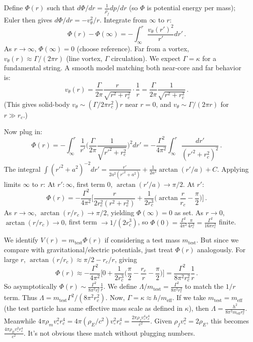 \documentclass[reprint,aps,onecolumn,nofootinbib]{revtex4-2}
\begin{document}
    Define $\Phi(r)$ such that $d\Phi/dr = \frac{1}{\rho_f}dp/dr$ (so $\Phi$ is potential energy per mass); Euler then gives $d\Phi/dr = -v_{\theta}^2/r$. Integrate from $\infty$ to $r$:
    \[
        \Phi(r) - \Phi(\infty) = -\int_{\infty}^{r} \frac{v_{\theta}(r')^2}{r'} dr'\,.
    \]
    As $r\to\infty$, $\Phi(\infty)=0$ (choose reference). Far from a vortex, $v_{\theta}(r) \approx \Gamma/(2\pi r)$ (line vortex, $\Gamma$ circulation). We expect $\Gamma = \kappa$ for a fundamental string. A smooth model matching both near-core and far behavior is:
    \[
        v_{\theta}(r) = \frac{\Gamma}{2\pi}\frac{r}{\sqrt{r^2+r_c^2}}\cdot\frac{1}{r} = \frac{\Gamma}{2\pi}\frac{1}{\sqrt{r^2+r_c^2}}\,.
    \]
    (This gives solid-body $v_{\theta}\sim (\Gamma/2\pi r_c^2)r$ near $r=0$, and $v_{\theta}\sim \Gamma/(2\pi r)$ for $r\gg r_c$.)

    Now plug in:
    \[
        \Phi(r) = -\int_{\infty}^{r} \frac{1}{r'}\Big(\frac{\Gamma}{2\pi}\frac{1}{\sqrt{r'^2+r_c^2}}\Big)^2 dr' = -\frac{\Gamma^2}{4\pi^2}\int_{\infty}^{r} \frac{dr'}{(r'^2+r_c^2)^2}\,.
    \]
    The integral $\int (r'^2+a^2)^{-2}dr' = \frac{r'}{2a^2(r'^2+a^2)} + \frac{1}{2a^3}\arctan(r'/a) + C$. Applying limits $\infty$ to $r$:
    At $r':\infty$, first term $0$, $\arctan(r'/a)\to\pi/2$. At $r'$:
    \[
        \Phi(r) = -\frac{\Gamma^2}{4\pi^2}\Big[\frac{r}{2r_c^2(r^2+r_c^2)} + \frac{1}{2r_c^3}\Big(\arctan\frac{r}{r_c} - \frac{\pi}{2}\Big)\Big]\,.
    \]
    As $r\to\infty$, $\arctan(r/r_c)\to\pi/2$, yielding $\Phi(\infty)=0$ as set. As $r\to0$, $\arctan(r/r_c)\to0$, first term $\to 1/(2r_c^3)$, so $\Phi(0) = \frac{\Gamma^2}{4\pi^2}\frac{\pi}{4r_c^3} = \frac{\Gamma^2}{16\pi r_c^3}$ finite.

    We identify $V(r) = m_{\text{test}}\Phi(r)$ if considering a test mass $m_{\text{test}}$. But since we compare with gravitational/electric potentials, just treat $\Phi(r)$ analogously. For large $r$, $\arctan(r/r_c)\approx \pi/2 - r_c/r$, giving
    \[
        \Phi(r)\approx -\frac{\Gamma^2}{4\pi^2}\Big[0 + \frac{1}{2r_c^3}\Big(\frac{\pi}{2}-\frac{r_c}{r}-\frac{\pi}{2}\Big)\Big] = \frac{\Gamma^2}{8\pi^2 r_c^2}\frac{1}{r}\,.
    \]
    So asymptotically $\Phi(r)\sim \frac{\Gamma^2}{8\pi^2r_c^2}\frac{1}{r}$. We define $\Lambda/m_{\text{test}} = \frac{\Gamma^2}{8\pi^2r_c^2}$ to match the $1/r$ term. Thus $\Lambda = m_{\text{test}}\Gamma^2/(8\pi^2r_c^2)$. Now, $\Gamma = \kappa \approx h/m_{\text{eff}}$. If we take $m_{\text{test}}=m_{\text{eff}}$ (the test particle has same effective mass scale as defined in $\kappa$), then $\Lambda = \frac{h^2}{8\pi^2 m_{\text{eff}} r_c^2}$. Meanwhile $4\pi\rho_m v_{\circ}^2 r_c^4 = 4\pi(\rho_E/c^2) v_{\circ}^2 r_c^4 = \frac{2\pi \rho_f v_{\circ}^4 r_c^4}{c^2}$. Given $\rho_f v_{\circ}^2 = 2\rho_E$, this becomes $\frac{4\pi \rho_E v_{\circ}^2 r_c^4}{c^2}$. It’s not obvious these match without plugging numbers.
\end{document}
